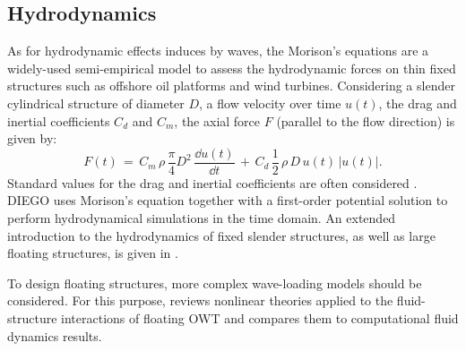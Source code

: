 

\subsection{Hydrodynamics}

As for hydrodynamic effects induces by waves, the Morison's equations are a widely-used semi-empirical model to assess the hydrodynamic forces on thin fixed structures such as offshore oil platforms and wind turbines. 
Considering a slender cylindrical structure of diameter $D$, a flow velocity over time $u(t)$, the drag and inertial coefficients $C_d$ and $C_m$, the axial force $F$ (parallel to the flow direction) is given by:   
\begin{equation}
    F(t)\,=\,C_{m}\,\rho \,{\frac {\pi }{4}}D^{2}\,{\frac{\dd u(t)}{\dd t}}\,+\,C_{d}\,{\frac 12}\,\rho \,D\,u(t)\,|u(t)|.
\end{equation}
Standard values for the drag and inertial coefficients are often considered \citep{dnv_2013_offshore_design}. 
DIEGO uses Morison's equation together with a first-order potential solution to perform hydrodynamical simulations in the time domain.
An extended introduction to the hydrodynamics of fixed slender structures, as well as large floating structures, is given in \citep[Chap. 1]{milano_thesis_2021}.  

To design floating structures, more complex wave-loading models should be considered. 
For this purpose, \citet{ronge_2023_hydrodynamics_fowt} reviews nonlinear theories applied to the fluid-structure interactions of floating OWT and compares them to computational fluid dynamics results. 


